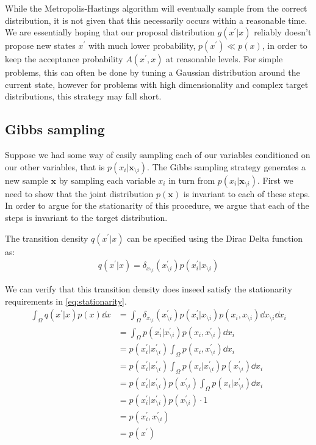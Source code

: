 While the Metropolis-Hastings algorithm will eventually sample from the correct distribution, it is not given that this necessarily occurs within a reasonable time. 
We are essentially hoping that our proposal distribution $g(x^\prime | x)$ reliably doesn't propose new states $x^\prime$ with much lower probability, $p(x^\prime) \ll p(x) $, in order to keep the acceptance probability $A(x^\prime, x)$ at reasonable levels. 
For simple problems, this can often be done by tuning a Gaussian distribution around the current state, however for problems with high dimensionality and complex target distributions, this strategy may fall short.

\subsection{Gibbs sampling}

Suppose we had some way of easily sampling each of our variables conditioned on our other variables, that is $p(x_i|\bm{x}_{\setminus i})$. 
The Gibbs sampling strategy generates a new sample $\bm{x}$ by sampling each variable $x_i$ in turn from $p(x_i|\bm{x}_{\setminus i})$.  
First we need to show that the joint distribution $p(\bm{x})$ is invariant to each of these steps. 
In order to argue for the stationarity of this procedure, we argue that each of the steps is invariant to the target distribution.

The transition density $q(x^\prime| x)$ can be specified using the Dirac Delta function as:
\begin{align*}
    q(x^\prime| x) = \delta_{x_{\setminus i}}(x^\prime_{\setminus i}) p(x_i^\prime|x_{\setminus i})
\end{align*}

We can verify that this transition density does inseed satisfy the stationarity requirements in \cref{eq:stationarity}.
\begin{align*}
    \int_{\Omega} q(x^\prime| x) p(x) \dd{x}  
    &= \int_{\Omega}  \delta_{x_{\setminus i}}(x^\prime_{\setminus i}) p(x_i^\prime|x_{\setminus i}) p(x_i,x_{\setminus i}) \dd{x_{\setminus i}} \dd{x_i} \\
    &= \int_{\Omega} p(x^\prime_i|x^\prime_{\setminus i}) p(x_i,x^\prime_{\setminus i}) \dd{x_i} \\ 
    &= p(x^\prime_i|x^\prime_{\setminus i}) \int_{\Omega}  p(x_i,x^\prime_{\setminus i}) \dd{x_i} \\ 
    &= p(x^\prime_i|x^\prime_{\setminus i}) \int_{\Omega}  p(x_i | x^\prime_{\setminus i}) p(x^\prime_{\setminus i}) \dd{x_i} \\ 
    &= p(x^\prime_i|x^\prime_{\setminus i}) p(x^\prime_{\setminus i}) \int_{\Omega}  p(x_i | x^\prime_{\setminus i})  \dd{x_i} \\ 
    &= p(x^\prime_i|x^\prime_{\setminus i}) p(x^\prime_{\setminus i}) \cdot 1 \\
    &=  p(x^\prime_i,x^\prime_{\setminus i})  \\
    &= p(x^\prime)
\end{align*}

